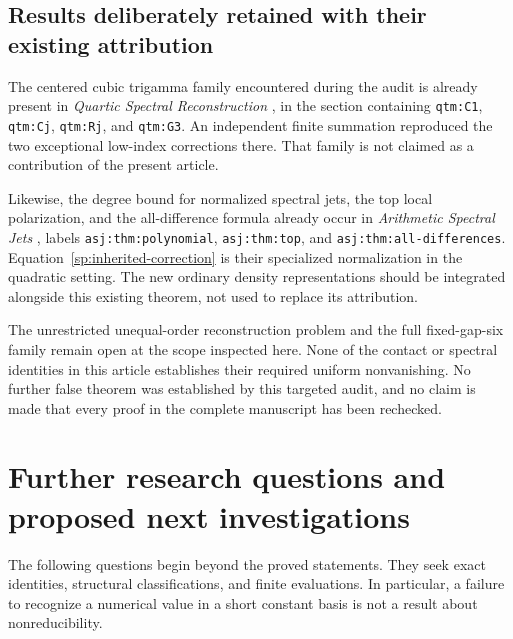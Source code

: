 \documentclass[11pt,letterpaper]{article}
\numberwithin{equation}{section}
\theoremstyle{definition}
\theoremstyle{remark}
\newcommand{\src}[1]{\nolinkurl{#1}}
\begin{document}
\subsection{Results deliberately retained with their existing attribution}

The centered cubic trigamma family encountered during the audit is already
present in \emph{Quartic Spectral Reconstruction}
\cite{ProveItQuartic}, in the section containing
\src{qtm:C1}, \src{qtm:Cj}, \src{qtm:Rj}, and \src{qtm:G3}.
An independent finite summation reproduced the two exceptional
low-index corrections there. That family is not claimed as a contribution
of the present article.

Likewise, the degree bound for normalized spectral jets, the top local
polarization, and the all-difference formula already occur in
\emph{Arithmetic Spectral Jets}
\cite{ProveItArithmeticJets}, labels
\src{asj:thm:polynomial},
\src{asj:thm:top}, and
\src{asj:thm:all-differences}.
Equation~\eqref{sp:inherited-correction} is their specialized
normalization in the quadratic setting. The new ordinary density
representations should be integrated alongside this existing theorem,
not used to replace its attribution.

The unrestricted unequal-order reconstruction problem and the full
fixed-gap-six family remain open at the scope inspected here. None of the
contact or spectral identities in this article establishes their required
uniform nonvanishing. No further false theorem was established by this
targeted audit, and no claim is made that every proof in the complete
manuscript has been rechecked.



\section{Further research questions and proposed next investigations}
\label{rq:section}

The following questions begin beyond the proved statements. They seek exact
identities, structural classifications, and finite evaluations. In
particular, a failure to recognize a numerical value in a short constant
basis is not a result about nonreducibility.
\end{document}
